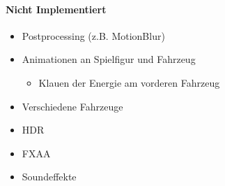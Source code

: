 \paragraph{Nicht Implementiert}
\begin{itemize}
    \item Postprocessing (z.B. MotionBlur)
	\item Animationen an Spielfigur und Fahrzeug
    \begin{itemize}
	\item Klauen der Energie am vorderen Fahrzeug
	\end{itemize}
	\item Verschiedene Fahrzeuge
    \item HDR
	\item FXAA
	\item Soundeffekte
\end{itemize}